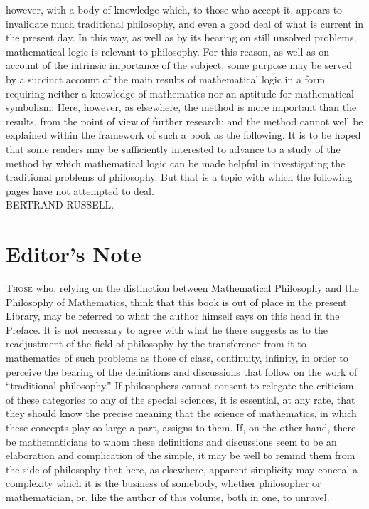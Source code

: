{however, with a body of knowledge which, to
those who accept it, appears to invalidate much traditional philosophy,
and even a good deal of what is current in the present day. In this
way, as well as by its bearing on still unsolved problems, mathematical
logic is relevant to philosophy. For this reason, as well as on account
of the intrinsic importance of the subject, some purpose may be served
by a succinct account of the main results of mathematical logic in a
form requiring neither a knowledge of mathematics nor an aptitude for
mathematical symbolism. Here, however, as elsewhere, the method is more
important than
the results, from the point of view of further research; and the method
cannot well be explained within the framework of such a book as the
following. It is to be hoped that some readers may be sufficiently
interested to advance to a study of the method by which mathematical
logic can be made helpful in investigating the traditional problems of
philosophy. But that is a topic with which the following pages have not
attempted to deal.}
\\ \phantom{x} \hfill BERTRAND RUSSELL.
\clearpage{}%
\chapter*{Editor's Note}\iphoneonly{\vspace{-2cm}}\ebkonly{\thispagestyle{empty}}
\noindent\kkpageindicatechapstart{vii}{pagevii}{\kckaddition{[The}}\kckaddition{\ note below was written
by J.\ H.\ Muirhead, LL.D., editor of the Library of Philosophy series in which
\textit{Introduction to Mathematical Philosophy}
was originally published.]}

\phantom{x}

\noindent\textsc{Those} who, 
relying on the
distinction between Mathematical
Philosophy and the Philosophy of Mathematics, think that this book is
out of place in the present Library, may be referred to what the author
himself says on this head in the Preface. It is not necessary to agree
with what he there suggests as to the readjustment of the field of
philosophy by the transference from it to mathematics of such problems
as those of class, continuity, infinity, in order to perceive the
bearing of the definitions and discussions that follow on the work of
``traditional philosophy.'' If philosophers cannot consent to relegate
the criticism of these categories to any of the special sciences, it is
essential, at any rate, that they should know the precise meaning that
the science of mathematics, in which these concepts play so large a
part, assigns to them. If, on the other hand, there be mathematicians
to whom these definitions and discussions seem to be an elaboration and
complication of the simple, it may be well to remind them from the side
of philosophy that here, as elsewhere, apparent simplicity may conceal
a complexity which it is the business of somebody, whether philosopher
or mathematician, or, like the author of this volume, both in one, to
unravel.
\mainmatter%
